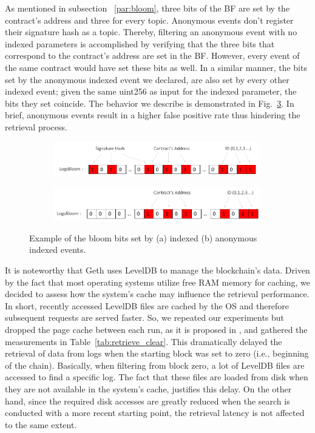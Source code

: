 As mentioned in subsection ~\ref{par:bloom}, three bits of the BF are set by the contract’s address and three for every topic. Anonymous events don’t register their signature hash as a topic. Thereby, filtering an anonymous event with no indexed parameters is accomplished by verifying that the three bits that correspond to the contract’s address are set in the BF. However, every event of the same contract would have set these bits as well. In a similar manner, the bits set by the anonymous indexed event we declared, are also set by every other indexed event; given the same uint256 as input for the indexed parameter, the bits they set coincide. The behavior we describe is demonstrated in Fig.~\ref{fig:bloom_combined}. In brief, anonymous events result in a higher false positive rate thus hindering the retrieval process.


\begin{figure}
    \begin{subfigure}{\linewidth}
        \centerline{\includegraphics[width=9cm]{figs/bloom_indexed.pdf}}
        \caption{}
        \label{fig:bloom_indexed}
    \end{subfigure}
    \begin{subfigure}{\linewidth}
        \centerline{\includegraphics[width=9cm]{figs/bloom_anonymous.pdf}}
        \caption{}
        \label{fig:bloom_anonymous}
    \end{subfigure}
    \caption{Example of the bloom bits set by (a) indexed (b) anonymous indexed events.}
    \label{fig:bloom_combined}
\end{figure}

It is noteworthy that Geth uses LevelDB to manage the blockchain's data. Driven by the fact that most operating systems utilize free RAM memory for caching, we decided to assess how the system’s cache may influence the retrieval performance. In short, recently accessed LevelDB files are cached by the OS and therefore subsequent requests are served faster. So, we repeated our experiments but dropped the page cache between each run, as it is proposed in  \citep{perez_2020}, and gathered the measurements in Table~\ref{tab:retrieve_clear}. This dramatically delayed the retrieval of data from logs when the starting block was set to zero (i.e., beginning of the chain). Basically, when filtering from block zero, a lot of LevelDB files are accessed to find a specific log. The fact that these files are loaded from disk when they are not available in the system’s cache, justifies this delay. On the other hand, since the required disk accesses are greatly reduced when the search is conducted with a more recent starting point, the retrieval latency is not affected to the same extent.

